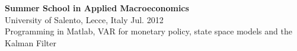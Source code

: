 \documentclass[margin,line]{resume}
\begin{document}
\begin{resume}
%   
%
%   
%   
%
%
        \textbf{Summer School in Applied Macroeconomics}\\
        University of Salento, Lecce, Italy \hfill Jul. 2012\\
        Programming in Matlab,  VAR for monetary policy, state space models and the Kalman Filter%
 


\end{resume}
\end{document}
